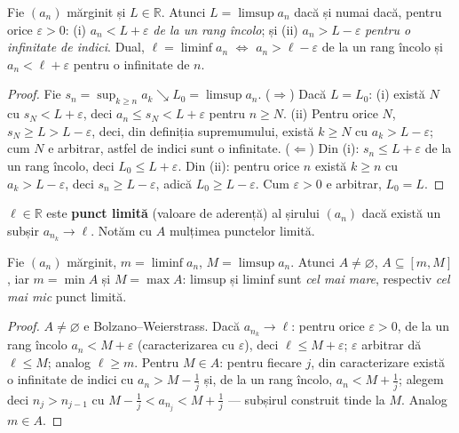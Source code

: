 \begin{propozitie}
Fie $(a_n)$ mărginit și $L\in\mathbb{R}$. Atunci $L=\limsup a_n$ dacă și numai dacă, pentru orice $\varepsilon>0$:
(i) $a_n<L+\varepsilon$ \emph{de la un rang încolo}; și
(ii) $a_n>L-\varepsilon$ \emph{pentru o infinitate de indici}.
Dual, $\ell=\liminf a_n$ $\iff$ $a_n>\ell-\varepsilon$ de la un rang încolo și $a_n<\ell+\varepsilon$ pentru o infinitate de $n$.
\end{propozitie}
\begin{proof}
Fie $s_n=\sup_{k\ge n}a_k\searrow L_0=\limsup a_n$.
($\Rightarrow$) Dacă $L=L_0$: (i) există $N$ cu $s_N<L+\varepsilon$, deci $a_n\le s_N<L+\varepsilon$ pentru $n\ge N$. (ii) Pentru orice $N$, $s_N\ge L>L-\varepsilon$, deci, din definiția supremumului, există $k\ge N$ cu $a_k>L-\varepsilon$; cum $N$ e arbitrar, astfel de indici sunt o infinitate.
($\Leftarrow$) Din (i): $s_n\le L+\varepsilon$ de la un rang încolo, deci $L_0\le L+\varepsilon$. Din (ii): pentru orice $n$ există $k\ge n$ cu $a_k>L-\varepsilon$, deci $s_n\ge L-\varepsilon$, adică $L_0\ge L-\varepsilon$. Cum $\varepsilon>0$ e arbitrar, $L_0=L$.
\end{proof}

\begin{definitie}
$\ell\in\mathbb{R}$ este \textbf{punct limită} (valoare de aderență) al șirului $(a_n)$ dacă există un subșir $a_{n_k}\to\ell$. Notăm cu $A$ mulțimea punctelor limită.
\end{definitie}

\begin{propozitie}
Fie $(a_n)$ mărginit, $m=\liminf a_n$, $M=\limsup a_n$. Atunci $A\neq\varnothing$, $A\subseteq[m,M]$, iar $m=\min A$ și $M=\max A$: limsup și liminf sunt \emph{cel mai mare}, respectiv \emph{cel mai mic} punct limită.
\end{propozitie}
\begin{proof}
$A\neq\varnothing$ e Bolzano--Weierstrass. Dacă $a_{n_k}\to\ell$: pentru orice $\varepsilon>0$, de la un rang încolo $a_n<M+\varepsilon$ (caracterizarea cu $\varepsilon$), deci $\ell\le M+\varepsilon$; $\varepsilon$ arbitrar dă $\ell\le M$; analog $\ell\ge m$. Pentru $M\in A$: pentru fiecare $j$, din caracterizare există o infinitate de indici cu $a_n>M-\frac1j$ și, de la un rang încolo, $a_n<M+\frac1j$; alegem deci $n_j>n_{j-1}$ cu $M-\frac1j<a_{n_j}<M+\frac1j$ --- subșirul construit tinde la $M$. Analog $m\in A$.
\end{proof}

